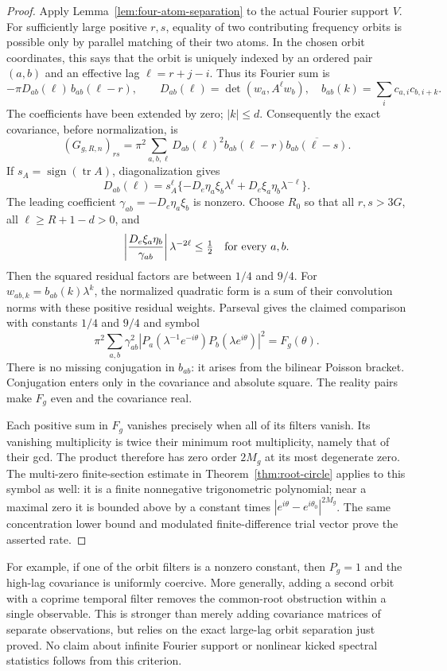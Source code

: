 \begin{proof}
Apply Lemma~\ref{lem:four-atom-separation} to the actual Fourier support $V$.
For sufficiently large positive $r,s$, equality of two contributing frequency
orbits is possible only by parallel matching of their two atoms. In the
chosen orbit coordinates, this says that the orbit is uniquely indexed by
an ordered pair $(a,b)$ and an effective lag $\ell=r+j-i$. Thus its Fourier
sum is
\[
 -\pi D_{ab}(\ell)\,b_{ab}(\ell-r),\qquad
 D_{ab}(\ell)=\det(w_a,A^\ell w_b),\quad
 b_{ab}(k)=\sum_i c_{a,i}c_{b,i+k}.
\]
The coefficients have been extended by zero; $|k|\le d$.
Consequently the exact covariance, before normalization, is
\[
 (G_{g,R,n})_{rs}
 =\pi^2\sum_{a,b,\ell}D_{ab}(\ell)^2
        b_{ab}(\ell-r)\overline{b_{ab}(\ell-s)}.
\]
If $s_A=\operatorname{sign}(\operatorname{tr}A)$, diagonalization gives
\[
 D_{ab}(\ell)=s_A^\ell
 \{-D_e\eta_a\xi_b\lambda^\ell+D_e\xi_a\eta_b\lambda^{-\ell}\}.
\]
The leading coefficient $\gamma_{ab}=-D_e\eta_a\xi_b$ is nonzero.
Choose $R_0$ so that all $r,s>3G$, all $\ell\ge R+1-d>0$, and
\[
 \left|\frac{D_e\xi_a\eta_b}{\gamma_{ab}}\right|
          \lambda^{-2\ell}\le\tfrac12
 \quad\hbox{for every }a,b.
\]
Then the squared residual factors are between $1/4$ and $9/4$.
For $w_{ab,k}=b_{ab}(k)\lambda^k$, the normalized quadratic form is a sum
of their convolution norms with these positive residual weights. Parseval
gives the claimed comparison with constants $1/4$ and $9/4$ and symbol
\[
 \pi^2\sum_{a,b}\gamma_{ab}^2
  |P_a(\lambda^{-1}e^{-i\theta})P_b(\lambda e^{i\theta})|^2=F_g(\theta).
\]
There is no missing conjugation in $b_{ab}$: it arises from the bilinear
Poisson bracket. Conjugation enters only in the covariance and absolute square.
The reality pairs make $F_g$ even and the covariance real.

Each positive sum in $F_g$ vanishes precisely when all of its filters vanish.
Its vanishing multiplicity is twice their minimum root multiplicity, namely
that of their gcd. The product therefore has zero order $2M_g$ at its
most degenerate zero. The multi-zero finite-section estimate in
Theorem~\ref{thm:root-circle} applies to this symbol as well: it is a finite
nonnegative trigonometric polynomial; near a maximal zero it is bounded above
by a constant times $|e^{i\theta}-e^{i\theta_0}|^{2M_g}$.
The same concentration lower bound and modulated finite-difference trial
vector prove the asserted rate.
\end{proof}
For example, if one of the orbit filters is a nonzero constant, then
$P_g=1$ and the high-lag covariance is uniformly coercive. More generally,
adding a second orbit with a coprime temporal filter removes the common-root
obstruction within a single observable. This is stronger than merely adding
covariance matrices of separate observations, but relies on the exact
large-lag orbit separation just proved. No claim about infinite Fourier
support or nonlinear kicked spectral statistics follows from this criterion.


